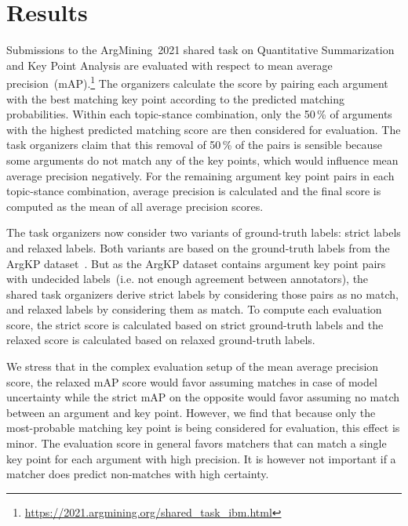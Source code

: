 \section{Results}\label{results}

Submissions to the ArgMining~2021 shared task on Quantitative Summarization and Key Point Analysis are evaluated with respect to mean average precision~(mAP).\footnote{\url{https://2021.argmining.org/shared_task_ibm.html}}
The organizers calculate the score by pairing each argument with the best matching key point according to the predicted matching probabilities.
Within each topic-stance combination, only the 50\,\% of arguments with the highest predicted matching score are then considered for evaluation.
The task organizers claim that this removal of 50\,\% of the pairs is sensible because some arguments do not match any of the key points, which would influence mean average precision negatively. %
For the remaining argument key point pairs in each topic-stance combination, average precision is calculated and the final score is computed as the mean of all average precision scores.

The task organizers now consider two variants of ground-truth labels: strict labels and relaxed labels.
Both variants are based on the ground-truth labels from the ArgKP dataset~\cite{Bar-HaimEFKLS2020}. But as the ArgKP dataset contains argument key point pairs with undecided labels~(i.e. not enough agreement between annotators), the shared task organizers derive strict labels by considering those pairs as no match, and relaxed labels by considering them as match. %
To compute each evaluation score, the strict score is calculated based on strict ground-truth labels and the relaxed score is calculated based on relaxed ground-truth labels. %

We stress that in the complex evaluation setup of the mean average precision score, the relaxed mAP score would favor assuming matches in case of model uncertainty while the strict mAP on the opposite would favor assuming no match between an argument and key point.
However, we find that because only the most-probable matching key point is being considered for evaluation, this effect is minor.
The evaluation score in general favors matchers that can match a single key point for each argument with high precision.
It is however not important if a matcher does predict non-matches with high certainty.

